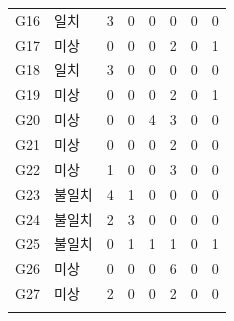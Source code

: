 \begin{revision}
\begin{table}[h]
\begin{tabular}[t]{llrrrrrr}
G16 & 일치 & 3 & 0 & 0 & 0 & 0 & 0 \\
G17 & 미상 & 0 & 0 & 0 & 2 & 0 & 1 \\
G18 & 일치 & 3 & 0 & 0 & 0 & 0 & 0 \\
G19 & 미상 & 0 & 0 & 0 & 2 & 0 & 1 \\
G20 & 미상 & 0 & 0 & 4 & 3 & 0 & 0 \\
G21 & 미상 & 0 & 0 & 0 & 2 & 0 & 0 \\
G22 & 미상 & 1 & 0 & 0 & 3 & 0 & 0 \\
G23 & 불일치 & 4 & 1 & 0 & 0 & 0 & 0 \\
G24 & 불일치 & 2 & 3 & 0 & 0 & 0 & 0 \\
G25 & 불일치 & 0 & 1 & 1 & 1 & 0 & 1 \\
G26 & 미상 & 0 & 0 & 0 & 6 & 0 & 0 \\
G27 & 미상 & 2 & 0 & 0 & 2 & 0 & 0 \\
\\
\bottomrule
\end{tabular}
\end{table}
\end{revision}

